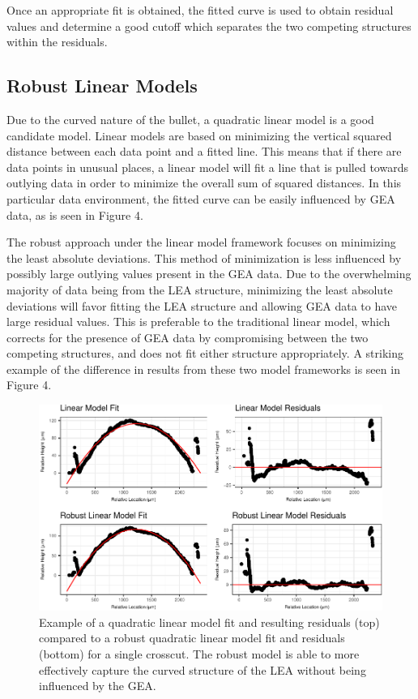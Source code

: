 \documentclass[]{article}
\begin{document}
Once an appropriate fit is obtained, the fitted curve is used to obtain
residual values and determine a good cutoff which separates the two
competing structures within the residuals.

\subsection{Robust Linear Models}

Due to the curved nature of the bullet, a quadratic linear model is a
good candidate model. Linear models are based on minimizing the vertical
squared distance between each data point and a fitted line. This means
that if there are data points in unusual places, a linear model will fit
a line that is pulled towards outlying data in order to minimize the
overall sum of squared distances. In this particular data environment,
the fitted curve can be easily influenced by GEA data, as is seen in
Figure 4.

The robust approach under the linear model framework focuses on
minimizing the least absolute deviations. This method of minimization is
less influenced by possibly large outlying values present in the GEA
data. Due to the overwhelming majority of data being from the LEA
structure, minimizing the least absolute deviations will favor fitting
the LEA structure and allowing GEA data to have large residual values.
This is preferable to the traditional linear model, which corrects for
the presence of GEA data by compromising between the two competing
structures, and does not fit either structure appropriately. A striking
example of the difference in results from these two model frameworks is
seen in Figure 4.

\begin{figure}
\centering
\includegraphics{writeup_files/figure-latex/unnamed-chunk-3-1.pdf}
\caption{Example of a quadratic linear model fit and resulting residuals
(top) compared to a robust quadratic linear model fit and residuals
(bottom) for a single crosscut. The robust model is able to more
effectively capture the curved structure of the LEA without being
influenced by the GEA.}
\end{figure}
\end{document}
